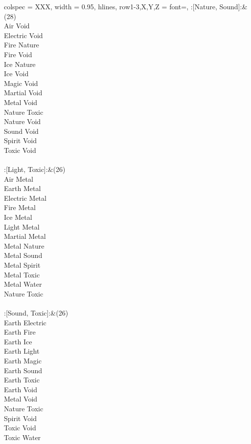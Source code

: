 \begin{longtblr}[
	caption = {2v2 Attacking Ineffective},
	label = {2v2-Attacking-Ineffective},
]{
	colspec = {XXX}, width = 0.95\linewidth,
	hlines,
	row{1-3,X,Y,Z} = {font=\bfseries},
}
	:[Nature, Sound]:&{(28)\\
	Air Void \\
	Electric Void \\
	Fire Nature \\
	Fire Void \\
	Ice Nature \\
	Ice Void \\
	Magic Void \\
	Martial Void \\
	Metal Void \\
	Nature Toxic \\
	Nature Void \\
	Sound Void \\
	Spirit Void \\
	Toxic Void \\
	}\\

	:[Light, Toxic]:&{(26)\\
	Air Metal \\
	Earth Metal \\
	Electric Metal \\
	Fire Metal \\
	Ice Metal \\
	Light Metal \\
	Martial Metal \\
	Metal Nature \\
	Metal Sound \\
	Metal Spirit \\
	Metal Toxic \\
	Metal Water \\
	Nature Toxic \\
	}\\

	:[Sound, Toxic]:&{(26)\\
	Earth Electric \\
	Earth Fire \\
	Earth Ice \\
	Earth Light \\
	Earth Magic \\
	Earth Sound \\
	Earth Toxic \\
	Earth Void \\
	Metal Void \\
	Nature Toxic \\
	Spirit Void \\
	Toxic Void \\
	Toxic Water \\
	}\\


\end{longtblr}
